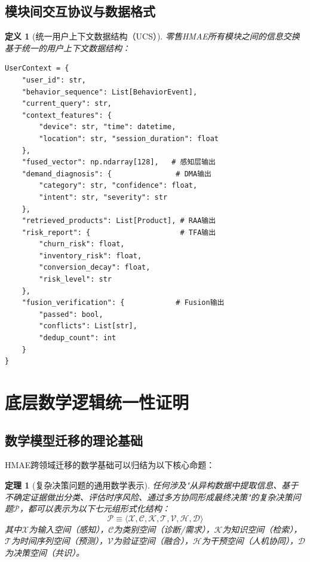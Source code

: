 \documentclass[11pt,a4paper]{ctexart}
\newtheorem{definition}{定义}[section]
\newtheorem{theorem}{定理}[section]
\theoremstyle{remark}
\begin{document}
\subsection{模块间交互协议与数据格式}

\begin{definition}[统一用户上下文数据结构（UCS）]
零售HMAE所有模块之间的信息交换基于统一的用户上下文数据结构：
\begin{verbatim}
UserContext = {
    "user_id": str,
    "behavior_sequence": List[BehaviorEvent],
    "current_query": str,
    "context_features": {
        "device": str, "time": datetime,
        "location": str, "session_duration": float
    },
    "fused_vector": np.ndarray[128],   # 感知层输出
    "demand_diagnosis": {               # DMA输出
        "category": str, "confidence": float,
        "intent": str, "severity": str
    },
    "retrieved_products": List[Product], # RAA输出
    "risk_report": {                     # TFA输出
        "churn_risk": float,
        "inventory_risk": float,
        "conversion_decay": float,
        "risk_level": str
    },
    "fusion_verification": {            # Fusion输出
        "passed": bool,
        "conflicts": List[str],
        "dedup_count": int
    }
}
\end{verbatim}
\end{definition}

\newpage

\section{底层数学逻辑统一性证明}

\subsection{数学模型迁移的理论基础}

HMAE跨领域迁移的数学基础可以归结为以下核心命题：

\begin{theorem}[复杂决策问题的通用数学表示]
任何涉及"从异构数据中提取信息、基于不确定证据做出分类、评估时序风险、通过多方协同形成最终决策"的复杂决策问题$\mathcal{P}$，都可以表示为以下七元组形式化结构：
\begin{equation}
\mathcal{P} \equiv \langle \mathcal{X}, \mathcal{C}, \mathcal{K}, \mathcal{T}, \mathcal{V}, \mathcal{H}, \mathcal{D} \rangle
\end{equation}
其中$\mathcal{X}$为输入空间（感知），$\mathcal{C}$为类别空间（诊断/需求），$\mathcal{K}$为知识空间（检索），$\mathcal{T}$为时间序列空间（预测），$\mathcal{V}$为验证空间（融合），$\mathcal{H}$为干预空间（人机协同），$\mathcal{D}$为决策空间（共识）。
\end{theorem}
\end{document}
